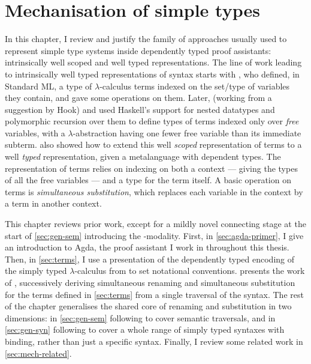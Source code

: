 \chapter{Mechanisation of simple types}\label{sec:simple}

In this chapter, I review and justify the family of approaches usually used to
represent simple type systems inside dependently typed proof assistants:
intrinsically well scoped and well typed representations.
The line of work leading to intrinsically well typed representations of syntax
starts with \citet{BH94}, who defined, in Standard ML, a type of
$\lambda$-calculus terms indexed on the set/type of variables they contain, and
gave some operations on them.
Later, \citet{AR99} (working from a suggestion by Hook) and \citet{BP99DeBruijn}
used Haskell's support for nested
datatypes and polymorphic recursion over them to define types of terms indexed
only over \emph{free} variables, with a $\lambda$-abstraction having one fewer
free variable than its immediate subterm.
 also showed how to extend this well \emph{scoped} representation of
terms to a well \emph{typed} representation, given a metalanguage with dependent
types.
The representation of terms relies on indexing on both a context --- giving the
types of all the free variables --- and a type for the term itself.
A basic operation on terms is \emph{simultaneous substitution}, which replaces
each variable in the context by a term in another context.

This chapter reviews prior work, except for a mildly novel connecting stage at
the start of \cref{sec:gen-sem} introducing the
\AgdaFunction{$\bigcirc$}-modality.
First, in \cref{sec:agda-primer}, I give an introduction to Agda, the proof
assistant I work in throughout this thesis.
Then, in \cref{sec:terms}, I use a presentation of the dependently typed
encoding of the simply typed $\lambda$-calculus from \citet{AR99} to set
notational conventions.
 presents the work of \citet{BHKM12},
successively deriving simultaneous renaming and simultaneous substitution for
the terms defined in \cref{sec:terms} from a single traversal of the syntax.
The rest of the chapter generalises the shared core of renaming and substitution
in two dimensions: in \cref{sec:gen-sem} following \citet{ACMM17} to cover
semantic traversals, and in \cref{sec:gen-syn} following \citet{AACMM21} to
cover a whole range of simply typed syntaxes with binding, rather than just
a specific syntax.
Finally, I review some related work in \cref{sec:mech-related}.

